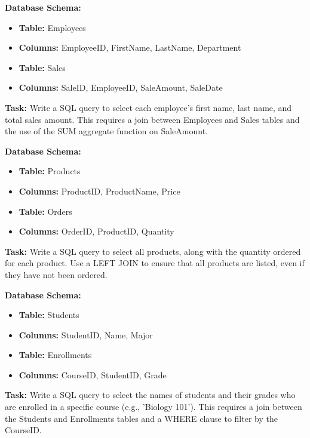 \begin{exerciseboxcomputer}
\noindent \textbf{Database Schema:}
\begin{itemize}
    \item \textbf{Table:} Employees
    \item \textbf{Columns:} EmployeeID, FirstName, LastName, Department
    \item \textbf{Table:} Sales
    \item \textbf{Columns:} SaleID, EmployeeID, SaleAmount, SaleDate
\end{itemize}

\noindent \textbf{Task:} Write a SQL query to select each employee's first name, last name, and total sales amount. This requires a join between Employees and Sales tables and the use of the SUM aggregate function on SaleAmount.\\
\end{exerciseboxcomputer}

\begin{exerciseboxcomputer}
\noindent \textbf{Database Schema:}
\begin{itemize}
    \item \textbf{Table:} Products
    \item \textbf{Columns:} ProductID, ProductName, Price
    \item \textbf{Table:} Orders
    \item \textbf{Columns:} OrderID, ProductID, Quantity
\end{itemize}

\noindent \textbf{Task:} Write a SQL query to select all products, along with the quantity ordered for each product. Use a LEFT JOIN to ensure that all products are listed, even if they have not been ordered.\\
\end{exerciseboxcomputer}

\begin{exerciseboxcomputer}
\noindent \textbf{Database Schema:}
\begin{itemize}
    \item \textbf{Table:} Students
    \item \textbf{Columns:} StudentID, Name, Major
    \item \textbf{Table:} Enrollments
    \item \textbf{Columns:} CourseID, StudentID, Grade
\end{itemize}

\noindent \textbf{Task:} Write a SQL query to select the names of students and their grades who are enrolled in a specific course (e.g., 'Biology 101'). This requires a join between the Students and Enrollments tables and a WHERE clause to filter by the CourseID.\\
\end{exerciseboxcomputer}

